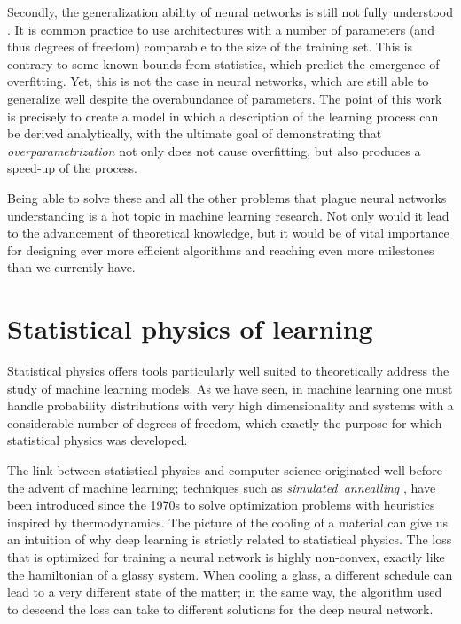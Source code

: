 Secondly, the generalization ability of neural networks is still not fully understood \cite{zhang2021understanding}.
It is common practice to use architectures with a number of parameters (and thus degrees of freedom) comparable to the size of the training set. This is contrary to some known bounds from statistics, which predict the emergence of overfitting. Yet, this is not the case in neural networks, which are still able to generalize well despite the overabundance of parameters.
The point of this work is precisely to create a model in which a description of the learning process can be derived analytically, with the ultimate goal of demonstrating that \emph{overparametrization} not only does not cause overfitting, but also produces a speed-up of the process.

Being able to solve these and all the other problems that plague neural networks understanding is a hot topic in machine learning research. Not only would it lead to the advancement of theoretical knowledge, but it would be of vital importance for designing ever more efficient algorithms and reaching even more milestones than we currently have.

\section{Statistical physics of learning}
Statistical physics offers tools particularly well suited to theoretically address the study of machine learning models.
As we have seen, in machine learning one must handle probability distributions with very high dimensionality and systems with a considerable number of degrees of freedom,
which exactly the purpose for which statistical physics was developed.

The link between statistical physics and computer science originated well before the advent of machine learning;
techniques such as \emph{simulated~annealling} \cite{kirkpatrick1983optimization},
have been introduced since the 1970s to solve optimization problems with heuristics inspired by thermodynamics.
The picture of the cooling of a material can give us an intuition of why deep learning is strictly related to statistical physics.
The loss that is optimized for training a neural network is highly non-convex, exactly like the hamiltonian of a glassy system.
When cooling a glass, a different schedule can lead to a very different state of the matter;
in the same way, the algorithm used to descend the loss can take to different solutions for the deep neural network.

